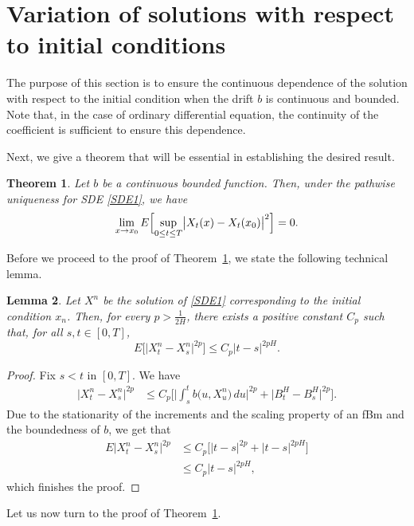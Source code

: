 \documentclass[numbers,compress,v1.0.1]{vmsta}
\newtheorem{theorem}{Theorem}[section]
\newtheorem{lemma}[theorem]{Lemma}
\theoremstyle{definition}
\newcommand{\rrvert}{\vert}
\newcommand{\llvert}{\vert}
\begin{document}
\section{Variation of solutions with respect to initial conditions}
The purpose of this section is to ensure the continuous dependence of
the solution with respect to the initial condition when the drift $b$
is continuous and bounded. Note that, in the case of ordinary
differential equation, the continuity of the coefficient is sufficient
to ensure this dependence.

Next, we give a theorem that will be essential in establishing the
desired result.
%
\begin{theorem}\label{main}
Let $b$ be a continuous bounded function. Then, under the pathwise
uniqueness for SDE \eqref{SDE1}, we have
%
\[
\lim_{x\rightarrow x_0} E \Bigl[\sup_{0\leq t\leq T}\bigl\llvert
X_t (x)-X_t (x_0)\bigr\rrvert
^{2} \Bigr]=0.
\]
%
\end{theorem}
%
Before we proceed to the proof of Theorem~\ref{main}, we state the
following technical lemma.
%
\begin{lemma} \label{tight}
Let $X^n$ be the solution of \eqref{SDE1} corresponding to the initial
condition $x_n$. Then, for every $p>\frac{1}{2H}$, there exists a
positive constant $C_p$ such that, for all $s, t \in[0,T]$,
%
\[
E\bigl[\bigl|X^{n}_t-X^{n}_s\bigr|^{2p}
\bigr] \leq C_p |t-s|^{2pH}.
\]
%
\end{lemma}
%
\begin{proof}
Fix $s<t$ in $[0,T]$. We have
%
\begin{align*}
\bigl|X^{n}_t-X^{n}_s\bigr|^{2p} &\leq C_p \Biggl[\Biggl\llvert \int_s^t b\bigl(u,X^{n}_u\bigr)\,du\Biggr\rrvert ^{2p} + \bigl|B^H_t-B^H_s\bigr|^{2p}\Biggr].
\end{align*}
%
Due to the stationarity of the increments and the scaling property
of an fBm and the boundedness of $b$, we get that
%
\begin{align*}
E\bigl|X^{n}_t-X^{n}_s\bigr|^{2p} &\leq C_p \bigl[ |t-s|^{2p}+|t-s|^{2pH} \bigr]\\
&\leq C_p|t-s|^{2pH},
\end{align*}
%
which finishes the proof.
\end{proof}
%
Let us now turn to the proof of Theorem~\ref{main}.
%
\end{document}
